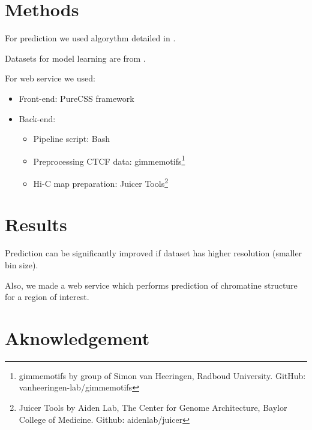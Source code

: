 \documentclass[conference]{IEEEtran}
\begin{document}

\section{Methods}

For prediction we used algorythm detailed in \cite{b1}.

Datasets for model learning are from \cite{b2}.

For web service we used:
\begin{itemize}
\item Front-end: PureCSS framework
\item Back-end:
\begin{itemize}
\item Pipeline script: Bash
\item Preprocessing CTCF data: gimmemotifs\footnote{gimmemotifs by group of Simon van Heeringen, Radboud University. GitHub: vanheeringen-lab/gimmemotifs}
\item Hi-C map preparation: Juicer Tools\footnote{Juicer Tools by Aiden Lab, The Center for Genome Architecture, Baylor College of Medicine. Github: aidenlab/juicer}
\end{itemize}
\end{itemize}


\section{Results}

Prediction can be significantly improved if dataset has higher resolution (smaller bin size).

Also, we made a web service which performs prediction of chromatine structure for a region of interest.


\section*{Aknowledgement}
\end{document}

